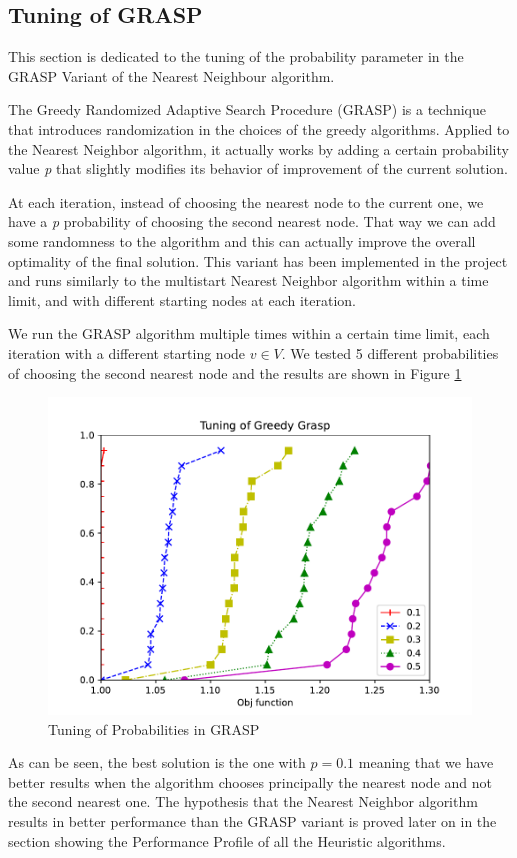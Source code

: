 \subsection{Tuning of GRASP}
This section is dedicated to the tuning of the probability parameter in the GRASP Variant of the Nearest Neighbour algorithm.

The Greedy Randomized Adaptive Search Procedure (GRASP) is a technique that introduces randomization in the choices of the greedy algorithms.
Applied to the Nearest Neighbor algorithm, it actually works by adding a certain probability value \textit{p} that slightly modifies its behavior of improvement of the current solution.

At each iteration, instead of choosing the nearest node to the current one, we have a \textit{p} probability of choosing the second nearest node. That way we can add some randomness to the algorithm and this can actually improve the overall optimality of the final solution.
This variant has been implemented in the project and runs similarly to the multistart Nearest Neighbor algorithm within a time limit, and with different starting nodes at each iteration.

We run the GRASP algorithm multiple times within a certain time limit, each iteration with a different starting node $v \in V$. We tested 5 different probabilities of choosing the second nearest node and the results are shown in Figure \ref{fig:grasp}

\begin{figure}[!h]
    \centering
    \includegraphics[width=\textwidth]{images/grasp.pdf}
    \caption{Tuning of Probabilities in GRASP}
    \label{fig:grasp}
\end{figure}

As can be seen, the best solution is the one with $p = 0.1$ meaning that we have better results when the algorithm chooses principally the nearest node and not the second nearest one. The hypothesis that the Nearest Neighbor algorithm results in better performance than the GRASP variant is proved later on in the section showing the Performance Profile of all the Heuristic algorithms.


